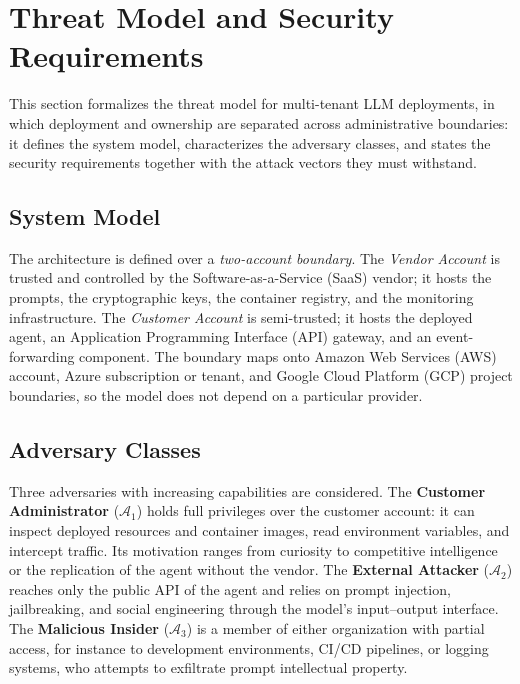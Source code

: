 \section{Threat Model and Security Requirements}
\label{sec:threats}

This section formalizes the threat model for multi-tenant LLM deployments, in which deployment and ownership are separated across administrative boundaries: it defines the system model, characterizes the adversary classes, and states the security requirements together with the attack vectors they must withstand.

\subsection{System Model}

The architecture is defined over a \emph{two-account boundary}. The \emph{Vendor Account} is trusted and controlled by the Software-as-a-Service (SaaS) vendor; it hosts the prompts, the cryptographic keys, the container registry, and the monitoring infrastructure. The \emph{Customer Account} is semi-trusted; it hosts the deployed agent, an Application Programming Interface (API) gateway, and an event-forwarding component. The boundary maps onto Amazon Web Services (AWS) account, Azure subscription or tenant, and Google Cloud Platform (GCP) project boundaries, so the model does not depend on a particular provider.

\subsection{Adversary Classes}

Three adversaries with increasing capabilities are considered. The \textbf{Customer Administrator} ($\mathcal{A}_1$) holds full privileges over the customer account: it can inspect deployed resources and container images, read environment variables, and intercept traffic. Its motivation ranges from curiosity to competitive intelligence or the replication of the agent without the vendor. The \textbf{External Attacker} ($\mathcal{A}_2$) reaches only the public API of the agent and relies on prompt injection, jailbreaking, and social engineering through the model's input--output interface. The \textbf{Malicious Insider} ($\mathcal{A}_3$) is a member of either organization with partial access, for instance to development environments, CI/CD pipelines, or logging systems, who attempts to exfiltrate prompt intellectual property.

